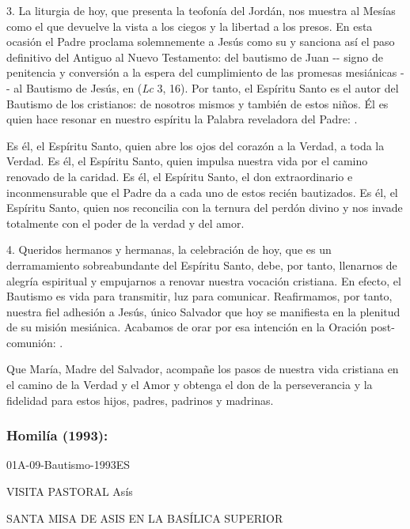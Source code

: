 \begin{body}
	3. La liturgia de hoy, que presenta la teofonía del Jordán, nos muestra al Mesías como el que devuelve la vista a los ciegos y la libertad a los presos. En esta ocasión el Padre proclama solemnemente a Jesús como su  y sanciona así el paso definitivo del Antiguo al Nuevo Testamento: del bautismo de Juan -\/- signo de penitencia y conversión a la espera del cumplimiento de las promesas mesiánicas -\/- al Bautismo de Jesús, en  (\emph{Lc} 3, 16). Por tanto, el Espíritu Santo es el autor del Bautismo de los cristianos: de nosotros mismos y también de estos niños. Él es quien hace resonar en nuestro espíritu la Palabra reveladora del Padre: .
	
	Es él, el Espíritu Santo, quien abre los ojos del corazón a la Verdad, a toda la Verdad. Es él, el Espíritu Santo, quien impulsa nuestra vida por el camino renovado de la caridad. Es él, el Espíritu Santo, el don extraordinario e inconmensurable que el Padre da a cada uno de estos recién bautizados. Es él, el Espíritu Santo, quien nos reconcilia con la ternura del perdón divino y nos invade totalmente con el poder de la verdad y del amor.
	
	4. Queridos hermanos y hermanas, la celebración de hoy, que es un derramamiento sobreabundante del Espíritu Santo, debe, por tanto, llenarnos de alegría espiritual y empujarnos a renovar nuestra vocación cristiana. En efecto, el Bautismo es vida para transmitir, luz para comunicar. Reafirmamos, por tanto, nuestra fiel adhesión a Jesús, único Salvador que hoy se manifiesta en la plenitud de su misión mesiánica. Acabamos de orar por esa intención en la Oración post-comunión: .
	
	Que María, Madre del Salvador, acompañe los pasos de nuestra vida cristiana en el camino de la Verdad y el Amor y obtenga el don de la perseverancia y la fidelidad para estos hijos, padres, padrinos y madrinas.
	
	\subsubsection{Homilía (1993): } 01A-09-Bautismo-1993ES
	
	VISITA PASTORAL Asís
	
	SANTA MISA DE ASIS EN LA BASÍLICA SUPERIOR
	

\end{body}
